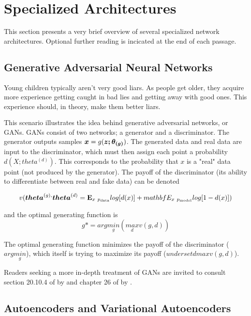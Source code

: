 \documentclass{article}
\begin{document}
\section{Specialized Architectures}

This section presents a very brief overview of several specialized network architectures. Optional further reading is incicated at the end of each passage.

\subsection{Generative Adversarial Neural Networks} %

Young children typically aren't very good liars. As people get older, they acquire more experience getting caught in bad lies and getting away with good ones. This experience should, in theory, make them better liars.

This scenario illustrates the idea behind generative adversarial networks, or GANs. GANs consist of two networks; a generator and a discriminator. The generator outputs samples \(\vb*{x} = g(\vb*{z; \theta_{(g)}})\). The generated data and real data are input to the discriminator, which must then assign each point a probability \(d(X; theta^{(d)})\). This corresponds to the probability that \(x\) is a "real" data point (not produced by the generator). The payoff of the discriminator \cite{Goodfellow-et-al-2016} (its ability to differentiate between real and fake data) can be denoted 

\[v(\vb*{theta}^{(g),}\vb*{theta}^{(d)} = \mathbf{E}_{x~p_{\text{data}}}log[d(x)] + mathbf{E}_{x~p_{\text{model}}}log[1-d(x)])\]

and the optimal generating function \cite{Goodfellow-et-al-2016} is
\[g* = arg\underset{g}{min}(\underset{d}{max}v(g,d))\]

The optimal generating function minimizes the payoff of the discriminator (\( arg\underset{g}{min}\)), which itself is trying to maximize its payoff (\(underset{d}{max}v(g,d)\)).

Readers seeking a more in-depth treatment of GANs are invited to consult section 20.10.4 of  by \citeauthor{Goodfellow-et-al-2016} and chapter 26 of  by \citeauthor{pml2Book}.

\subsection{Autoencoders and Variational Autoencoders}
\end{document}
